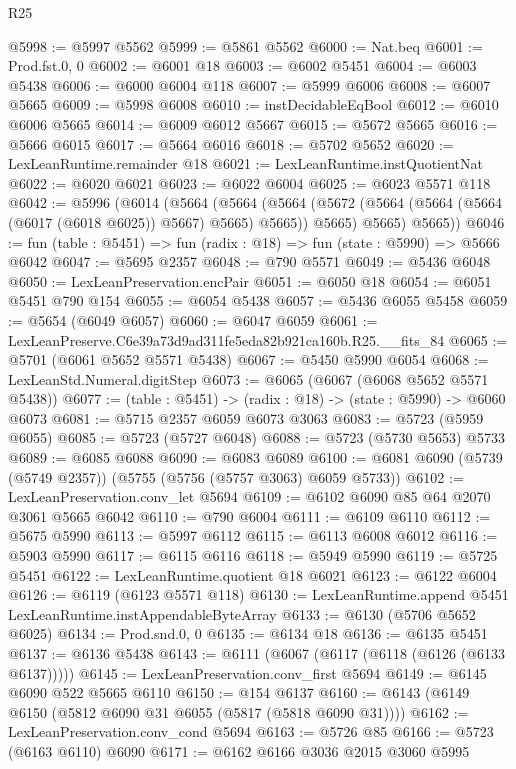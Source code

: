 \begin{lexlean}{R25}
\begin{coremodule}
@5998 := @5997 @5562
@5999 := @5861 @5562
@6000 := Nat.beq
@6001 := Prod.fst.{0, 0}
@6002 := @6001 @18
@6003 := @6002 @5451
@6004 := @6003 @5438
@6006 := @6000 @6004 @118
@6007 := @5999 @6006
@6008 := @6007 @5665
@6009 := @5998 @6008
@6010 := instDecidableEqBool
@6012 := @6010 @6006 @5665
@6014 := @6009 @6012 @5667
@6015 := @5672 @5665
@6016 := @5666 @6015
@6017 := @5664 @6016
@6018 := @5702 @5652
@6020 := LexLeanRuntime.remainder @18
@6021 := LexLeanRuntime.instQuotientNat
@6022 := @6020 @6021
@6023 := @6022 @6004
@6025 := @6023 @5571 @118
@6042 := @5996
    (@6014
      (@5664
        (@5664
          (@5664 (@5672 (@5664 (@5664 (@5664 (@6017 (@6018 @6025)) @5667) @5665) @5665)) @5665)
          @5665)
        @5665))
@6046 := fun (table : @5451) => fun (radix : @18) => fun (state : @5990) => @5666 @6042
@6047 := @5695 @2357
@6048 := @790 @5571
@6049 := @5436 @6048
@6050 := LexLeanPreservation.encPair
@6051 := @6050 @18
@6054 := @6051 @5451 @790 @154
@6055 := @6054 @5438
@6057 := @5436 @6055 @5458
@6059 := @5654 (@6049 @6057)
@6060 := @6047 @6059
@6061 := LexLeanPreserve.C6e39a73d9ad311fe5eda82b921ca160b.R25.__fits_84
@6065 := @5701 (@6061 @5652 @5571 @5438)
@6067 := @5450 @5990 @6054
@6068 := LexLeanStd.Numeral.digitStep
@6073 := @6065 (@6067 (@6068 @5652 @5571 @5438))
@6077 := (table : @5451) -> (radix : @18) -> (state : @5990) -> @6060 @6073
@6081 := @5715 @2357 @6059 @6073 @3063
@6083 := @5723 (@5959 @6055)
@6085 := @5723 (@5727 @6048)
@6088 := @5723 (@5730 @5653) @5733
@6089 := @6085 @6088
@6090 := @6083 @6089
@6100 := @6081 @6090 (@5739 (@5749 @2357)) (@5755 (@5756 (@5757 @3063) @6059 @5733))
@6102 := LexLeanPreservation.conv_let @5694
@6109 := @6102 @6090 @85 @64 @2070 @3061 @5665 @6042
@6110 := @790 @6004
@6111 := @6109 @6110
@6112 := @5675 @5990
@6113 := @5997 @6112
@6115 := @6113 @6008 @6012
@6116 := @5903 @5990
@6117 := @6115 @6116
@6118 := @5949 @5990
@6119 := @5725 @5451
@6122 := LexLeanRuntime.quotient @18 @6021
@6123 := @6122 @6004
@6126 := @6119 (@6123 @5571 @118)
@6130 := LexLeanRuntime.append @5451 LexLeanRuntime.instAppendableByteArray
@6133 := @6130 (@5706 @5652 @6025)
@6134 := Prod.snd.{0, 0}
@6135 := @6134 @18
@6136 := @6135 @5451
@6137 := @6136 @5438
@6143 := @6111 (@6067 (@6117 (@6118 (@6126 (@6133 @6137)))))
@6145 := LexLeanPreservation.conv_first @5694
@6149 := @6145 @6090 @522 @5665 @6110
@6150 := @154 @6137
@6160 := @6143 (@6149 @6150 (@5812 @6090 @31 @6055 (@5817 (@5818 @6090 @31))))
@6162 := LexLeanPreservation.conv_cond @5694
@6163 := @5726 @85
@6166 := @5723 (@6163 @6110) @6090
@6171 := @6162 @6166 @3036 @2015 @3060 @5995

\end{coremodule}
\end{lexlean}
